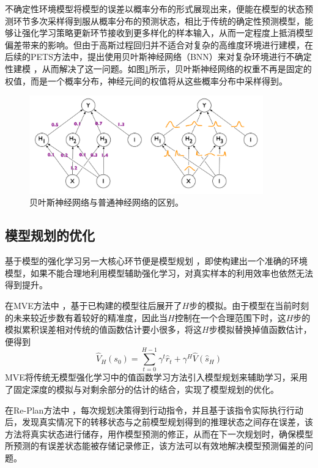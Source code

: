 不确定性环境模型将模型的误差以概率分布的形式展现出来，便能在模型的状态预测环节多次采样得到服从概率分布的预测状态，相比于传统的确定性预测模型，能够让强化学习策略更新环节接收到更多样化的样本输入，从而一定程度上抵消模型偏差带来的影响。但由于高斯过程回归并不适合对复杂的高维度环境进行建模，在后续的PETS方法中，提出使用贝叶斯神经网络（BNN）来对复杂环境进行不确定性建模 \cite{Blundell2015WeightNetworks}，从而解决了这一问题。如图\ref{fig:BNN}所示，贝叶斯神经网络的权重不再是固定的权值，而是一个概率分布，神经元间的权值将从这些概率分布中采样得到。

\begin{figure}[tbh]
\centering
\includegraphics[width=0.9\textwidth]{figures/BNN.png}
\caption{贝叶斯神经网络与普通神经网络的区别。}
\label{fig:BNN}
\end{figure}

\subsection{模型规划的优化}

基于模型的强化学习另一大核心环节便是模型规划 \cite{walsh2010integrating}，即使构建出一个准确的环境模型，如果不能合理地利用模型辅助强化学习，对真实样本的利用效率也依然无法得到提升。

在MVE方法中 \cite{feinberg2018model}，基于已构建的模型往后展开了$H$步的模拟。由于模型在当前时刻的未来较近步数有着较好的精准度，因此当$H$控制在一个合理范围下时，这$H$步的模拟累积误差相对传统的值函数估计要小很多，将这$H$步模拟替换掉值函数估计，便得到
\begin{equation}
    \hat{V}_{H}\left(s_{0}\right)=\sum_{t=0}^{H-1} \gamma^{t} \hat{r}_{t}+\gamma^{H} \hat{V}\left(\hat{s}_{H}\right)
\end{equation}
MVE将传统无模型强化学习中的值函数学习方法引入模型规划来辅助学习，采用了固定深度的模拟与对剩余部分的估计的结合，实现了模型规划的优化。

在Re-Plan方法中 \cite{williams2017information}，每次规划决策得到行动指令，并且基于该指令实际执行行动后，发现真实情况下的转移状态与之前模型规划得到的推理状态之间存在误差，该方法将真实状态进行储存，用作模型预测的修正，从而在下一次规划时，确保模型所预测的有误差状态能被存储记录修正，该方法可以有效地解决模型预测偏差的问题。

